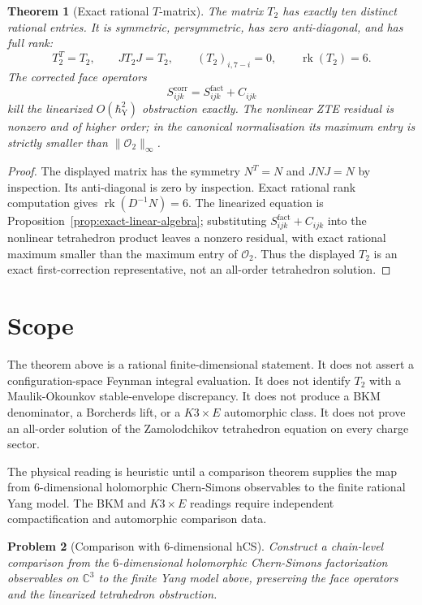\documentclass[11pt]{article}
\newtheorem{theorem}{Theorem}[section]
\newtheorem{problem}[theorem]{Problem}
\theoremstyle{remark}
\providecommand{\C}{\mathbb{C}}
\providecommand{\rk}{\operatorname{rk}}
\providecommand{\hbarY}{\hbar_{\mathrm{Y}}}
\providecommand{\cO}{\mathcal{O}}
\begin{document}
\begin{theorem}[Exact rational \(T\)-matrix]
\label{thm:exact-t-matrix}
The matrix \(T_2\) has exactly ten distinct rational entries.  It is
symmetric, persymmetric, has zero anti-diagonal, and has full rank:
\[
 T_2^T=T_2,\qquad JT_2J=T_2,\qquad (T_2)_{i,7-i}=0,\qquad
 \rk(T_2)=6.
\]
The corrected face operators
\[
 S^{\mathrm{corr}}_{ijk}=S^{\mathrm{fact}}_{ijk}+C_{ijk}
\]
kill the linearized \(O(\hbarY^2)\) obstruction exactly.  The nonlinear
ZTE residual is nonzero and of higher order; in the canonical
normalisation its maximum entry is strictly smaller than
\(\|\cO_2\|_\infty\).
\end{theorem}

\begin{proof}
The displayed matrix has the symmetry \(N^T=N\) and \(JNJ=N\) by
inspection.  Its anti-diagonal is zero by inspection.  Exact rational
rank computation gives \(\rk(D^{-1}N)=6\).  The linearized equation is
Proposition~\ref{prop:exact-linear-algebra}; substituting
\(S^{\mathrm{fact}}_{ijk}+C_{ijk}\) into the nonlinear tetrahedron
product leaves a nonzero residual, with exact rational maximum smaller
than the maximum entry of \(\cO_2\).  Thus the displayed \(T_2\) is an
exact first-correction representative, not an all-order tetrahedron
solution.
\end{proof}

\section{Scope}
\label{sec:scope}

The theorem above is a rational finite-dimensional statement.  It
does not assert a configuration-space Feynman integral evaluation.
It does not identify \(T_2\) with a Maulik-Okounkov stable-envelope
discrepancy.  It does not produce a BKM denominator, a Borcherds lift,
or a \(K3\times E\) automorphic class.  It does not prove an all-order
solution of the Zamolodchikov tetrahedron equation on every charge
sector.

The physical reading is heuristic until a comparison theorem supplies
the map from \(6\)-dimensional holomorphic Chern-Simons observables to
the finite rational Yang model.  The BKM and \(K3\times E\) readings
require independent compactification and automorphic comparison data.

\begin{problem}[Comparison with \(6\)-dimensional hCS]
Construct a chain-level comparison from the \(6\)-dimensional
holomorphic Chern-Simons factorization observables on \(\C^3\) to the
finite Yang model above, preserving the face operators and the
linearized tetrahedron obstruction.
\end{problem}
\end{document}
